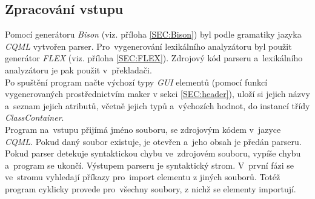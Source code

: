 \documentclass[11pt,twoside,a4paper]{book}
\begin{document}
\subsection{Zpracování vstupu}
Pomocí generátoru \textit{Bison} (viz. příloha \ref{SEC:Bison}) byl podle gramatiky jazyka \textit{CQML} vytvořen parser. Pro~vygenerování lexikálního analyzátoru byl použit generátor \textit{FLEX} (viz. příloha \ref{SEC:FLEX}). Zdrojový kód parseru a~lexikálního analyzátoru je pak použit v~překladači.\\
Po spuštění program načte výchozí typy \textit{GUI} elementů (pomocí funkcí vygenerovaných prostřednictvím maker v sekci \ref{SEC:header}), uloží si jejich názvy a~seznam jejich atributů, včetně jejich typů a~výchozích hodnot, do instancí třídy \textit{ClassContainer}.\\
Program na~vstupu přijímá jméno souboru, se zdrojovým kódem v~jazyce \textit{CQML}. Pokud daný soubor existuje, je otevřen a~jeho obsah je předán parseru. Pokud parser detekuje syntaktickou chybu ve~zdrojovém souboru, vypíše chybu a~program se ukončí. Výstupem parseru je syntaktický strom. V~první fázi se ve~stromu vyhledají příkazy pro~import elementu z jiných souborů. Totéž program cyklicky provede pro~všechny soubory, z nichž se elementy importují.
\end{document}
